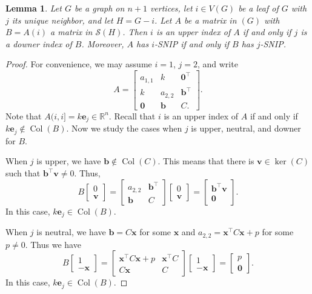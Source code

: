 \documentclass{article}
\newtheorem{lemma}[theorem]{Lemma}
\theoremstyle{definition}
\newcommand{\trans}{^\top}
\newcommand{\bzero}{\mathbf{0}}
\newcommand{\bb}{\mathbf{b}}
\newcommand{\be}{\mathbf{e}}
\newcommand{\bx}{\mathbf{x}}
\newcommand{\bv}{\mathbf{v}}
\newcommand{\Col}{\operatorname{Col}}
\newcommand{\mptn}{\mathcal{S}} %
\begin{document}
\begin{lemma}
\label{lem:updown}
Let $G$ be a graph on $n + 1$ vertices, let $i\in V(G)$ be a leaf of $G$ with $j$ its unique neighbor, and let $H = G - i$.
Let $A$ be a matrix in $(G)$ with $B = A(i)$ a matrix in $\mptn(H)$.  Then $i$ is an upper index of $A$ if and only if $j$ is a downer index of $B$.  Moreover, $A$ has $i$-SNIP if and only if $B$ has $j$-SNIP.
\end{lemma}
\begin{proof}
For convenience, we may assume $i = 1$, $j = 2$, and write 
\[
    A = \begin{bmatrix}
        a_{1,1} & k & \bzero\trans \\
        k & a_{2,2} & \bb\trans \\
        \bzero & \bb & C.
    \end{bmatrix}.
\]
Note that $A(i,i] = k\be_j\in\mathbb{R}^n$.  Recall that $i$ is an upper index of $A$ if and only if $k\be_j\notin\Col(B)$.  Now we study the cases when $j$ is upper, neutral, and downer for $B$.  

When $j$ is upper, we have $\bb\notin\Col(C)$.  This means that there is $\bv\in\ker(C)$ such that $\bb\trans\bv\neq 0$.  Thus, 
\[
    B\begin{bmatrix} 0 \\ \bv \end{bmatrix} = 
    \begin{bmatrix}
    a_{2,2} & \bb\trans \\
    \bb & C
    \end{bmatrix}\begin{bmatrix} 0 \\ \bv \end{bmatrix} = 
    \begin{bmatrix} \bb\trans\bv \\ \bzero \end{bmatrix}.
\]
In this case, $k\be_j\in\Col(B)$.

When $j$ is neutral, we have $\bb = C\bx$ for some $\bx$ and $a_{2,2} = \bx\trans C\bx + p$ for some $p \neq 0$.  Thus we have
\[
    B\begin{bmatrix} 1 \\ -\bx \end{bmatrix} = 
    \begin{bmatrix}
    \bx\trans C\bx + p & \bx\trans C \\
    C\bx & C
    \end{bmatrix}\begin{bmatrix} 1 \\ -\bx \end{bmatrix} = 
    \begin{bmatrix} p \\ \bzero \end{bmatrix}.
\]
In this case, $k\be_j\in\Col(B)$.


\end{proof}
\end{document}
